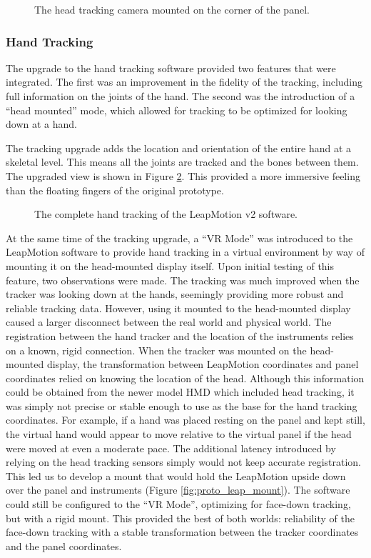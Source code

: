 \begin{figure}
    \centering
    \caption{The head tracking camera mounted on the corner of the panel.}
    \label{fig:proto_camera}
\end{figure}


\subsubsection{Hand Tracking}

The upgrade to the hand tracking software provided two features that were integrated.
The first was an improvement in the fidelity of the tracking, including full information on the joints of the hand.
The second was the introduction of a ``head mounted'' mode, which allowed for tracking to be optimized for looking down at a hand.

The tracking upgrade adds the location and orientation of the entire hand at a skeletal level.
This means all the joints are tracked and the bones between them.
The upgraded view is shown in Figure \ref{fig:proto_skeleton}.
This provided a more immersive feeling than the floating fingers of the original prototype.

\begin{figure}
    \centering
    \caption{The complete hand tracking of the LeapMotion v2 software.}
    \label{fig:proto_skeleton}
\end{figure}

At the same time of the tracking upgrade, a ``VR Mode'' was introduced to the LeapMotion software to provide hand tracking in a virtual environment by way of mounting it on the head-mounted display itself.
Upon initial testing of this feature, two observations were made.
The tracking was much improved when the tracker was looking down at the hands, seemingly providing more robust and reliable tracking data.
However, using it mounted to the head-mounted display caused a larger disconnect between the real world and physical world.
The registration between the hand tracker and the location of the instruments relies on a known, rigid connection.
When the tracker was mounted on the head-mounted display, the transformation between LeapMotion coordinates and panel coordinates relied on knowing the location of the head.
Although this information could be obtained from the newer model HMD which included head tracking, it was simply not precise or stable enough to use as the base for the hand tracking coordinates.
For example, if a hand was placed resting on the panel and kept still, the virtual hand would appear to move relative to the virtual panel if the head were moved at even a moderate pace.
The additional latency introduced by relying on the head tracking sensors simply would not keep accurate registration.
This led us to develop a mount that would hold the LeapMotion upside down over the panel and instruments (Figure \ref{fig:proto_leap_mount}).
The software could still be configured to the ``VR Mode'', optimizing for face-down tracking, but with a rigid mount.
This provided the best of both worlds: reliability of the face-down tracking with a stable transformation between the tracker coordinates and the panel coordinates.

